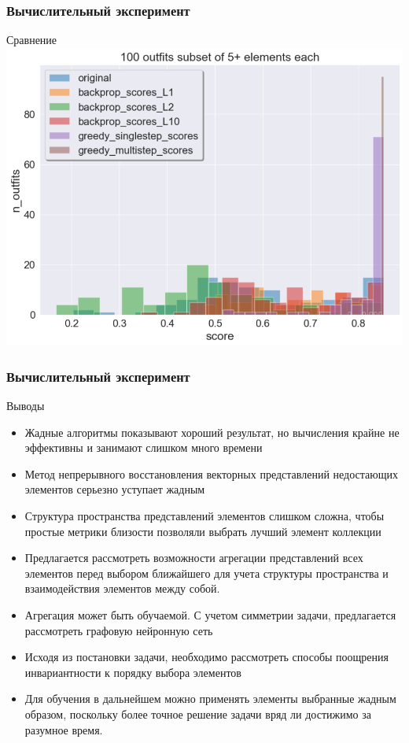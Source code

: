 \documentclass[10pt]{beamer}
\begin{document}
\begin{frame}
	\frametitle{Вычислительный эксперимент}
	\begin{block}{Сравнение}
		\includegraphics[scale = 0.52]{../figures/greedy_and_backprop_at_least_5_subset100.png}
	\end{block}
\end{frame}


\begin{frame}
	\frametitle{Вычислительный эксперимент}
	\begin{block}{Выводы}
		\begin{itemize}
			\item Жадные алгоритмы показывают хороший результат, но вычисления крайне не эффективны и занимают слишком много времени
			\item Метод непрерывного восстановления векторных представлений недостающих элементов серьезно уступает жадным
			\item Структура пространства представлений элементов слишком сложна, чтобы простые метрики близости позволяли выбрать лучший элемент коллекции 
			\item Предлагается рассмотреть возможности агрегации представлений всех элементов перед выбором ближайшего для учета структуры пространства и взаимодействия элементов между собой.
			\item Агрегация может быть обучаемой. С учетом симметрии задачи, предлагается рассмотреть графовую нейронную сеть
			\item Исходя из постановки задачи, необходимо рассмотреть способы поощрения инвариантности к порядку выбора элементов
			\item Для обучения в дальнейшем можно применять элементы выбранные жадным образом, поскольку более точное решение задачи вряд ли достижимо за разумное время.
				
		\end{itemize}
	\end{block}
\end{frame}
\end{document}

